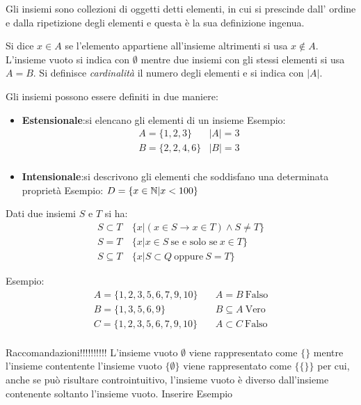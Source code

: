 Gli insiemi sono collezioni di oggetti detti elementi, in cui si prescinde dall'
ordine e dalla ripetizione degli elementi e questa è la sua definizione ingenua.

Si dice $x \in A$ se l'elemento appartiene all'insieme altrimenti si usa $x \not \in A$.
L'insieme vuoto si indica con $\emptyset$ mentre due insiemi con gli stessi elementi si usa $A = B$.\newline
Si definisce \textit{cardinalità} il numero degli elementi e si indica con $|A|$.

Gli insiemi possono essere definiti in due maniere:
\begin{itemize}
  \item \textbf{Estensionale}:si elencano gli elementi di un insieme\newline
        Esempio:
        \begin{equation*}
        \begin{split}
            A = \{1,2,3\} & |A| = 3 \\
            B = \{2,2,4,6\} & |B| = 3 \\
        \end{split}
        \end{equation*}
  \item \textbf{Intensionale}:si descrivono gli elementi che soddisfano una determinata proprietà\newline
        Esempio: \newline
        $D = \{x \in \mathbb{N} | x < 100\}$
\end{itemize}

Dati due insiemi $S$ e $T$ si ha:
\begin{align*}
  S \subset T & \ \{x | (x \in S \rightarrow x \in T) \land S \not = T \} \\
  S = T & \  \{x | x \in S \ \text{se e solo se} \ x \in T \} \\
  S \subseteq T & \ \{x | S \subset Q \ \text{oppure} \ S = T \}
\end{align*}

Esempio:
\begin{align*}
A = \{1,2,3,5,6,7,9,10 \}  & \quad A = B  \ \text{Falso}\\
B = \{1,3,5,6,9 \}  & \quad B \subseteq A \ \text{Vero}\\
C = \{1,2,3,5,6,7,9,10 \} & \quad A \subset C \ \text{Falso}\\
\end{align*}

Raccomandazioni!!!!!!!!!!
L'insieme vuoto $\emptyset$ viene rappresentato come $\{ \}$ mentre l'insieme contentente
l'insieme vuoto $\{ \emptyset \}$ viene rappresentato come $\{ \{ \} \}$ per cui,
anche se può risultare controintuitivo, l'insieme vuoto è diverso dall'insieme
contenente soltanto l'insieme vuoto.
Inserire Esempio


